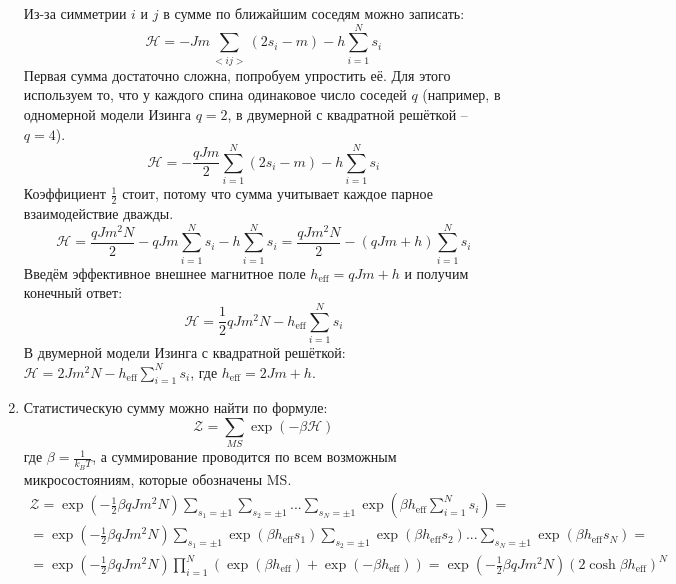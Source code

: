 \documentclass[12pt]{article}
\begin{document}
\begin{enumerate}
\begin{equation}
    \end{equation}
    Из-за симметрии $i$ и $j$ в сумме по ближайшим соседям можно записать:
    \begin{equation}
        \mathcal{H}=-Jm\sum\limits_{<ij>}(2s_i-m)-h\sum\limits_{i=1}^Ns_i
    \end{equation}
    Первая сумма достаточно сложна, попробуем упростить её. Для этого используем то, что у каждого спина одинаковое число соседей $q$ (например, в одномерной модели Изинга $q=2$, в двумерной с квадратной решёткой -- $q=4$).
    \begin{equation}
        \mathcal{H}=-\frac{qJm}{2}\sum\limits_{i=1}^{N}(2s_i-m)-h\sum\limits_{i=1}^Ns_i
    \end{equation}
    Коэффициент $\frac{1}{2}$ стоит, потому что сумма учитывает каждое парное взаимодействие дважды.
    \begin{equation}
        \mathcal{H}=\frac{qJm^2N}{2}-qJm\sum\limits_{i=1}^{N}s_i-h\sum\limits_{i=1}^Ns_i=\frac{qJm^2N}{2}-(qJm+h)\sum\limits_{i=1}^{N}s_i
    \end{equation}
    Введём эффективное внешнее магнитное поле $\boxed{h_\text{eff}=qJm+h}$ и получим конечный ответ:
    \begin{equation}            
        \boxed{\mathcal{H}=\frac{1}{2}qJm^2N-h_\text{eff}\sum\limits_{i=1}^{N}s_i}
    \end{equation}
    В двумерной модели Изинга с квадратной решёткой: $\mathcal{H}=2Jm^2N-h_\text{eff}\sum\limits_{i=1}^{N}s_i$, где $h_\text{eff}=2Jm+h$.
    \item Статистическую сумму можно найти по формуле:
    \begin{equation}
        \mathcal{Z}=\sum\limits_{MS}\exp(-\beta\mathcal{H})
    \end{equation}
    где $\beta=\frac{1}{k_B T}$, а суммирование проводится по всем возможным микросостояниям, которые обозначены MS.
    \begin{multline*}
        \mathcal{Z}=\exp\left(-\frac{1}{2}\beta qJm^2N\right)\sum\limits_{s_1=\pm 1}\sum\limits_{s_2=\pm 1}...\sum\limits_{s_N=\pm 1}\exp\left(\beta h_\text{eff}\sum\limits_{i=1}^{N}s_i\right)=\\
        =\exp\left(-\frac{1}{2}\beta qJm^2N\right)\sum\limits_{s_1=\pm 1}\exp\left(\beta h_\text{eff}s_1\right)\sum\limits_{s_2=\pm 1}\exp\left(\beta h_\text{eff}s_2\right)...\sum\limits_{s_N=\pm 1}\exp\left(\beta h_\text{eff}s_N\right)=\\
        =\exp\left(-\frac{1}{2}\beta qJm^2N\right)\prod_{i=1}^N(\exp\left(\beta h_\text{eff}\right)+\exp\left(-\beta h_\text{eff}\right))=\exp\left(-\frac{1}{2}\beta qJm^2N\right)(2\cosh{\beta h_\text{eff}})^N

\end{multline*}
\end{enumerate}
\end{document}

